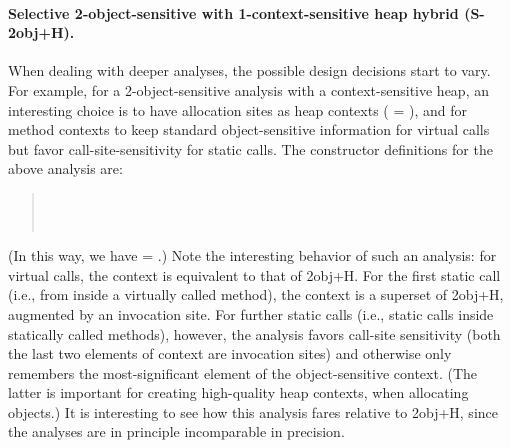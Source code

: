 \paragraph{Selective 2-object-sensitive with 1-context-sensitive heap hybrid (S-2obj+H).}

When dealing with deeper analyses, the possible design decisions start
to vary. For example, for a 2-object-sensitive analysis with a
context-sensitive heap, an interesting choice is to have allocation sites as
heap contexts ( = ), and for method contexts to
keep standard object-sensitive information for virtual calls but favor
call-site-sensitivity for static calls. The constructor definitions for the
above analysis are:
\begin{quote}
 \\
 \\
\end{quote}
(In this way, we have  = .)  Note the interesting
behavior of such an analysis: for virtual calls, the context is
equivalent to that of 2obj+H. For the first static call (i.e., from
inside a virtually called method), the context is a superset of
2obj+H, augmented by an invocation site. For further static calls
(i.e., static calls inside statically called methods), however, the
analysis favors call-site sensitivity (both the last two elements of
context are invocation sites) and otherwise only remembers the
most-significant element of the object-sensitive context. (The latter
is important for creating high-quality heap contexts, when allocating
objects.) It is interesting to see how this analysis fares relative to
2obj+H, since the analyses are in principle incomparable in precision.



